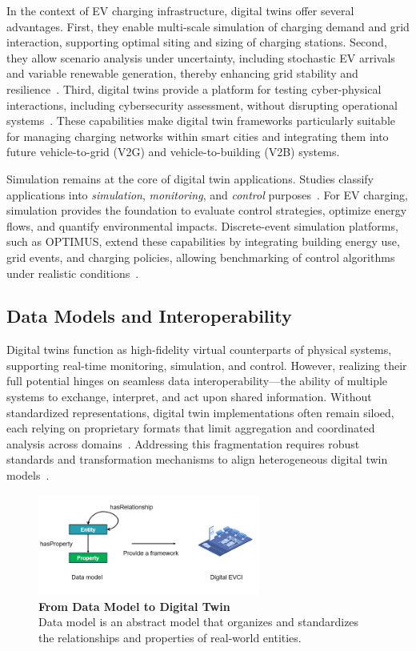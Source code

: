 In the context of EV charging infrastructure, digital twins offer 
several advantages. First, they enable multi-scale simulation of 
charging demand and grid interaction, supporting optimal siting and 
sizing of charging stations. Second, they allow scenario analysis under 
uncertainty, including stochastic EV arrivals and variable renewable 
generation, thereby enhancing grid stability and resilience~\cite{Talusan2024}. 
Third, digital twins provide a platform for testing cyber-physical 
interactions, including cybersecurity assessment, without disrupting 
operational systems~\cite{Eckhart2019}. These capabilities make digital 
twin frameworks particularly suitable for managing charging networks 
within smart cities and integrating them into future vehicle-to-grid (V2G) 
and vehicle-to-building (V2B) systems.

Simulation remains at the core of digital twin applications. Studies 
classify applications into \emph{simulation}, \emph{monitoring}, and 
\emph{control} purposes~\cite{Enders2019}. For EV charging, simulation 
provides the foundation to evaluate control strategies, optimize energy 
flows, and quantify environmental impacts. Discrete-event simulation 
platforms, such as OPTIMUS, extend these capabilities by integrating 
building energy use, grid events, and charging policies, allowing 
benchmarking of control algorithms under realistic conditions~\cite{Talusan2024}. 

\subsection{Data Models and Interoperability}

Digital twins function as high-fidelity virtual counterparts of physical systems, supporting real-time monitoring, simulation, and control. However, realizing their full potential hinges on seamless data interoperability—the ability of multiple systems to exchange, interpret, and act upon shared information. Without standardized representations, digital twin implementations often remain siloed, each relying on proprietary formats that limit aggregation and coordinated analysis across domains~\cite{David2024}. Addressing this fragmentation requires robust standards and transformation mechanisms to align heterogeneous digital twin models~\cite{Schmidt2023}.

\begin{figure}[ht!]
    \centering
    \includegraphics[width=0.65\textwidth]{Images/data-model.png}
    \caption{\textbf{From Data Model to Digital Twin}\\
    Data model is an abstract model that 
organizes and standardizes the relationships and properties of real-world entities. 
}
    \label{fig:data-model}
\end{figure}


